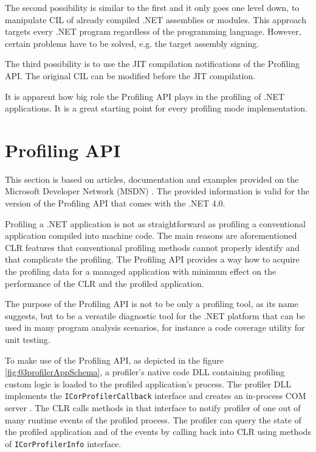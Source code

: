 The second possibility is similar to the first and it only goes one level down, to manipulate CIL of already compiled .NET assemblies or modules. This approach targets every .NET program regardless of the programming language. However, certain problems have to be solved, e.g. the target assembly signing.

The third possibility is to use the JIT compilation notifications of the Profiling API. The original CIL can be modified before the JIT compilation.

It is apparent how big role the Profiling API plays in the profiling of .NET applications. It is a great starting point for every profiling mode implementation.

\section{Profiling API}
This section is based on articles, documentation and examples provided on the Microsoft Developer Network (MSDN) \cite{ProfMSDN}. The provided information is valid for the version of the Profiling API that comes with the .NET 4.0. 

Profiling a .NET application is not as straightforward as profiling a conventional application compiled into machine code. The main reasons are aforementioned CLR features that conventional profiling methods cannot properly identify and that complicate the profiling. The Profiling API provides a way how to acquire the profiling data for a managed application with minimum effect on the performance of the CLR and the profiled application. 

The purpose of the Profiling API is not to be only a profiling tool, as its name suggests, but to be a versatile diagnostic tool for the .NET platform that can be used in many program analysis scenarios, for instance a code coverage utility for unit testing.

To make use of the Profiling API, as depicted in the figure \ref{fig:03profilerAppSchema}, a profiler's native code DLL containing profiling custom logic is loaded to the profiled application's process. The profiler DLL implements the \texttt{ICorProfilerCallback} interface and creates an in-process COM server . The CLR calls methods in that interface to notify profiler of one out of many runtime events of the profiled process. The profiler can query the state of the profiled application and of the events by calling back into CLR using methods of \texttt{ICorProfilerInfo} interface.

